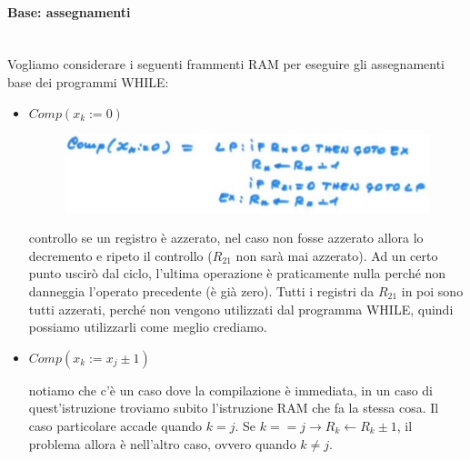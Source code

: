 \documentclass{article}
\begin{document}
\paragraph{Base: assegnamenti}\mbox{}\\
Vogliamo considerare i seguenti frammenti RAM per eseguire gli assegnamenti base dei programmi WHILE:
\begin{itemize}
    \item $Comp(x_k:=0)$
          \begin{figure}[H]
              \centering
              \includegraphics[scale=0.4]{images/assegnamento_ram.png}
          \end{figure}
          controllo se un registro è azzerato, nel caso non fosse azzerato allora lo decremento
          e ripeto il controllo ($R_{21}$ non sarà mai azzerato). Ad un certo punto uscirò dal ciclo,
          l'ultima operazione è praticamente nulla perché non danneggia l'operato precedente (è già zero).
          Tutti i registri da $R_{21}$ in poi sono tutti azzerati, perché non vengono utilizzati dal programma
          WHILE, quindi possiamo utilizzarli come meglio crediamo.

    \item $Comp(x_k:=x_j\pm 1)$

          notiamo che c'è un caso dove la compilazione è immediata, in un caso di quest'istruzione
          troviamo subito l'istruzione RAM che fa la stessa cosa. Il caso particolare accade quando
          $k=j$. Se $k==j\rightarrow R_k\leftarrow R_k\pm 1$, il problema allora è nell'altro caso,
          ovvero quando $k\neq j$.


\end{itemize}
\end{document}
